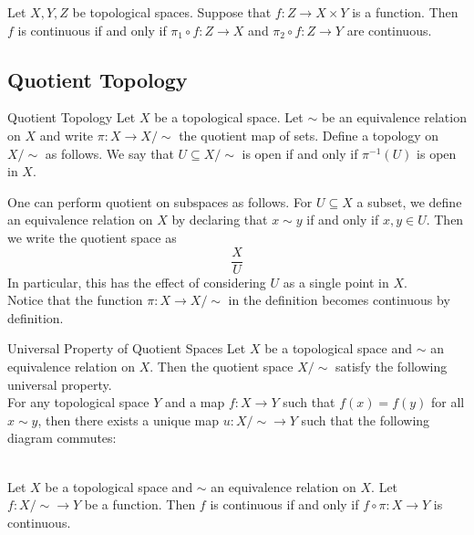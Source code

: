 \documentclass[a4paper]{article}
\begin{document}
\begin{prp}{}{} Let $X,Y,Z$ be topological spaces. Suppose that $f:Z\to X\times Y$ is a function. Then $f$ is continuous if and only if $\pi_1\circ f:Z\to X$ and $\pi_2\circ f:Z\to Y$ are continuous. 
\end{prp}

\subsection{Quotient Topology}
\begin{defn}{Quotient Topology}{} Let $X$ be a topological space. Let $\sim$ be an equivalence relation on $X$ and write $\pi:X\to X/\sim$ the quotient map of sets. Define a topology on $X/\sim$ as follows. We say that $U\subseteq X/\sim$ is open if and only if $\pi^{-1}(U)$ is open in $X$. 
\end{defn}

One can perform quotient on subspaces as follows. For $U\subseteq X$ a subset, we define an equivalence relation on $X$ by declaring that $x\sim y$ if and only if $x,y\in U$. Then we write the quotient space as $$\frac{X}{U}$$ In particular, this has the effect of considering $U$ as a single point in $X$. \\

Notice that the function $\pi:X\to X/\sim$ in the definition becomes continuous by definition. 

\begin{thm}{Universal Property of Quotient Spaces}{} Let $X$ be a topological space and $\sim$ an equivalence relation on $X$. Then the quotient space $X/\sim$ satisfy the following universal property. \\

For any topological space $Y$ and a map $f:X\to Y$ such that $f(x)=f(y)$ for all $x\sim y$, then there exists a unique map $u:X/\sim\to Y$ such that the following diagram commutes: \\
 \\
\end{thm}

\begin{prp}{}{} Let $X$ be a topological space and $\sim$ an equivalence relation on $X$. Let $f:X/\sim\to Y$ be a function. Then $f$ is continuous if and only if $f\circ\pi:X\to Y$ is continuous. 
\end{prp}
\end{document}
